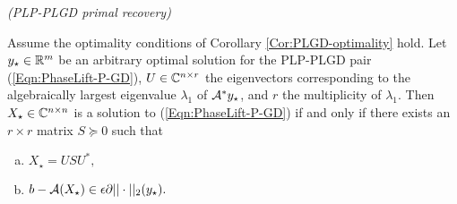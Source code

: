 \begin{cor} 		\label{Cor:PLGD-primal_recovery_refinement}
\emph{(PLP-PLGD primal recovery)}

Assume the optimality conditions of Corollary \ref{Cor:PLGD-optimality} hold. Let $y_\star \in {\mathbb R}^m$ be an arbitrary optimal solution for the PLP-PLGD pair (\ref{Eqn:PhaseLift-P-GD}),  $U \in {\mathbb C}^{n \times r}$ the eigenvectors corresponding to the algebraically largest eigenvalue $\lambda_1$ of ${\mathcal A}^*y_\star$, and $r$ the multiplicity of $\lambda_1$.  
Then $X_\star \in {\mathbb C}^{n \times n}$ is a solution to (\ref{Eqn:PhaseLift-P-GD}) if and only if there exists an $r \times r$ matrix $S \succeq 0$ such that
\begin{enumerate}[(a)]
\item
$X_\star = USU^*,$
\item
$b - {\mathcal A}(X_\star) \in \epsilon \partial ||\cdot||_2(y_\star).$
\end{enumerate}
\end{cor}
